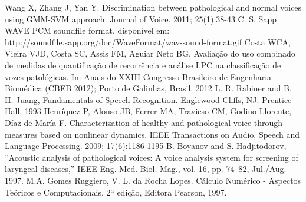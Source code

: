 \documentclass[a4paper,12pt,oneside]{report}
\begin{document}
\begin{thebibliography}{9}
Wang X, Zhang J, Yan Y. Discrimination between pathological and normal voices using GMM-SVM approach. Journal of Voice. 2011; 25(1):38-43
C. S. Sapp  WAVE PCM soundfile format, dispon\'{i}vel em: http://soundfile.sapp.org/doc/WaveFormat/wav-sound-format.gif
Costa WCA, Vieira VJD, Costa SC, Assis FM, Aguiar Neto BG. Avalia\c{c}\~{a}o do uso combinado de medidas de quantifica\c{c}\~{a}o de recorrência e an\'{a}lise LPC na classifica\c{c}\~{a}o de vozes patol\'{o}gicas. In: Anais do XXIII Congresso Brasileiro de Engenharia Biom\'{e}dica (CBEB 2012); Porto de Galinhas, Brasil. 2012
L. R. Rabiner and B. H. Juang, Fundamentals of Speech Recognition. Englewood Cliffs, NJ: Prentice-Hall, 1993
Henr\'{i}quez P, Alonso JB, Ferrer MA, Travieso CM, Godino-Llorente, D\'{i}az-de-Mar\'{i}a F. Characterization of healthy and pathological voice through measures based on nonlinear dynamics. IEEE Transactions on Audio, Speech and Language Processing. 2009; 17(6):1186-1195
B. Boyanov and S. Hadjitodorov, ''Acoustic analysis of pathological voices: A voice analysis system for screening of laryngeal diseases,'' IEEE Eng. Med. Biol. Mag., vol. 16, pp. 74–82, Jul./Aug. 1997.
M.A. Gomes Ruggiero, V. L. da Rocha Lopes. C\'{a}lculo Num\'{e}rico - Aspectos Te\'{o}ricos e Computacionais, 2ª edi\c{c}\~{a}o, Editora Pearson, 1997.
\end{thebibliography}
\end{document}

